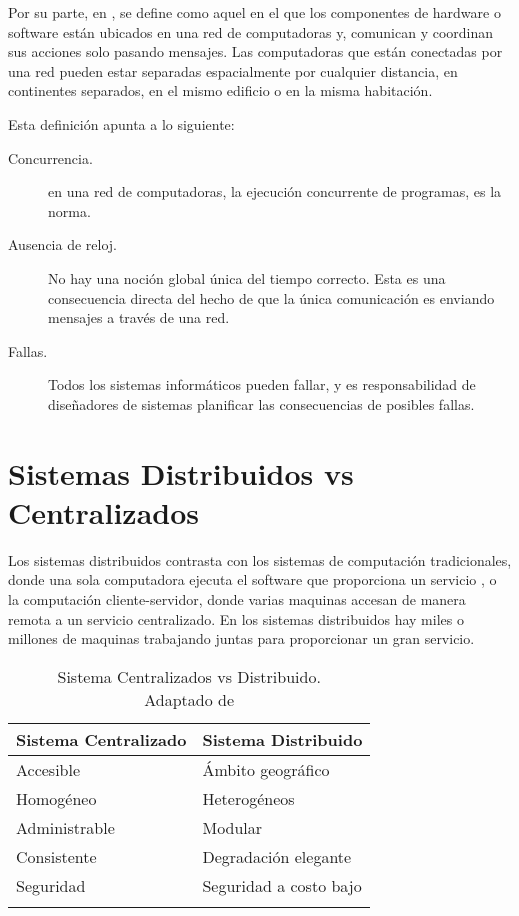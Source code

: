 Por su parte, en \cite{Coulouris2011}, se define como aquel en el que los componentes de hardware o software están ubicados en una red de  computadoras y, comunican y coordinan sus acciones solo pasando mensajes. Las computadoras que están conectadas por una red pueden estar separadas espacialmente por cualquier distancia, en continentes separados, en el mismo edificio o en la misma habitación.

Esta definición  apunta a lo siguiente:
\begin{description}
	\item[{Concurrencia.}] en una red de computadoras, la ejecución concurrente de programas, es la norma. 
	
	\item[{Ausencia de reloj.}]	 No hay una noción global única del tiempo correcto. Esta es una consecuencia directa del hecho de que la única comunicación es enviando mensajes a través de una red.
	
	\item[{Fallas.}] Todos los sistemas informáticos pueden fallar, y es responsabilidad de diseñadores de sistemas  planificar las consecuencias de posibles fallas.  
\end{description}

\section{ Sistemas Distribuidos vs Centralizados}
Los sistemas distribuidos contrasta con los sistemas de computación tradicionales,  donde una sola computadora ejecuta el software que proporciona un \gls{servicio} , o la computación \gls{cliente-servidor}, donde varias maquinas accesan de manera remota a un servicio centralizado.
En los sistemas distribuidos hay miles o millones de maquinas trabajando juntas para proporcionar un gran servicio. 

\begin{table}[h]
	\footnotesize%
	\begin{center}
		\footnotesize
		\begin{tabular}{ll}
			\toprule
			Sistema Centralizado &  Sistema Distribuido \\
			\midrule
			\quad Accesible &  \'Ambito geográfico    \\
			\quad Homog\'eneo    &  Heterogéneos  \\
			\quad Administrable     &  Modular  \\
			\quad Consistente   & Degradación elegante \\
			\quad Seguridad  & Seguridad a costo bajo  \\
			\addlinespace 
			\bottomrule
		\end{tabular}
	\end{center}
	\caption{Sistema Centralizados vs Distribuido. \\ Adaptado de \cite{Verissimo2012} }
	\label{tab:centra-dist}
\end{table}

